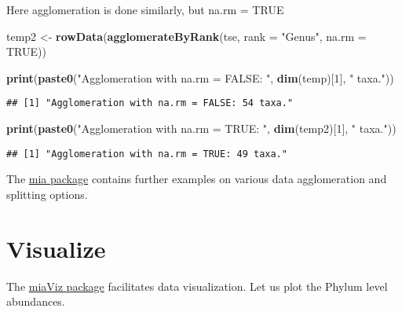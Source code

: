 \documentclass[
  oneside]{book}
\newenvironment{Shaded}{\begin{snugshade}}{\end{snugshade}}
\newcommand{\DataTypeTok}[1]{\textcolor[rgb]{0.13,0.29,0.53}{#1}}
\newcommand{\DecValTok}[1]{\textcolor[rgb]{0.00,0.00,0.81}{#1}}
\newcommand{\KeywordTok}[1]{\textcolor[rgb]{0.13,0.29,0.53}{\textbf{#1}}}
\newcommand{\NormalTok}[1]{#1}
\newcommand{\OtherTok}[1]{\textcolor[rgb]{0.56,0.35,0.01}{#1}}
\newcommand{\StringTok}[1]{\textcolor[rgb]{0.31,0.60,0.02}{#1}}
\begin{document}
Here agglomeration is done similarly, but na.rm = TRUE

\begin{Shaded}
\begin{Highlighting}[]
\NormalTok{temp2 <-}\StringTok{ }\KeywordTok{rowData}\NormalTok{(}\KeywordTok{agglomerateByRank}\NormalTok{(tse, }\DataTypeTok{rank =} \StringTok{"Genus"}\NormalTok{, }\DataTypeTok{na.rm =} \OtherTok{TRUE}\NormalTok{))}

\KeywordTok{print}\NormalTok{(}\KeywordTok{paste0}\NormalTok{(}\StringTok{"Agglomeration with na.rm = FALSE: "}\NormalTok{, }\KeywordTok{dim}\NormalTok{(temp)[}\DecValTok{1}\NormalTok{], }\StringTok{" taxa."}\NormalTok{))}
\end{Highlighting}
\end{Shaded}

\begin{verbatim}
## [1] "Agglomeration with na.rm = FALSE: 54 taxa."
\end{verbatim}

\begin{Shaded}
\begin{Highlighting}[]
\KeywordTok{print}\NormalTok{(}\KeywordTok{paste0}\NormalTok{(}\StringTok{"Agglomeration with na.rm = TRUE: "}\NormalTok{, }\KeywordTok{dim}\NormalTok{(temp2)[}\DecValTok{1}\NormalTok{], }\StringTok{" taxa."}\NormalTok{))}
\end{Highlighting}
\end{Shaded}

\begin{verbatim}
## [1] "Agglomeration with na.rm = TRUE: 49 taxa."
\end{verbatim}

The \href{https://microbiome.github.io/mia/reference/index.html}{mia
package}
contains further examples on various data agglomeration and splitting
options.

\hypertarget{visualize}{%
\section{Visualize}\label{visualize}}

The \href{https://microbiome.github.io/miaViz/}{miaViz package} facilitates
data visualization. Let us plot the Phylum level abundances.
\end{document}
